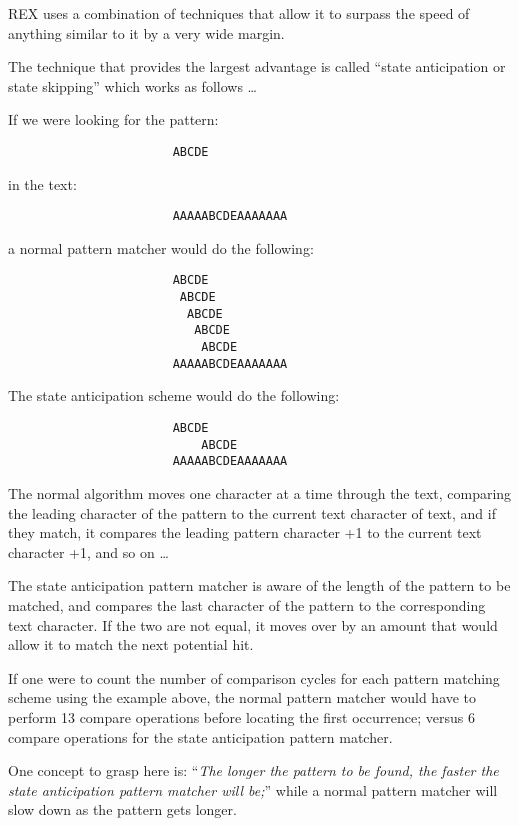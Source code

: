 REX uses a combination of techniques that allow it to surpass the
speed of anything similar to it by a very wide margin.

The technique that provides the largest advantage is called ``state
anticipation or state skipping'' which works as follows \ldots

If we were looking for the pattern:
\begin{verbatim}
                       ABCDE
\end{verbatim}
in the text:
\begin{verbatim}
                       AAAAABCDEAAAAAAA
\end{verbatim}
a normal pattern matcher would do the following:
\begin{verbatim}
                       ABCDE
                        ABCDE
                         ABCDE
                          ABCDE
                           ABCDE
                       AAAAABCDEAAAAAAA
\end{verbatim}

The state anticipation scheme would do the following:

\begin{verbatim}
                       ABCDE
                           ABCDE
                       AAAAABCDEAAAAAAA
\end{verbatim}

The normal algorithm moves one character at a time through the text,
comparing the leading character of the pattern to the current text
character of text, and if they match, it compares the leading pattern
character +1 to the current text character +1, and so on \ldots

The state anticipation pattern matcher is aware of the length of the
pattern to be matched, and compares the last character of the pattern
to the corresponding text character.  If the two are not equal, it
moves over by an amount that would allow it to match the next
potential hit.

If one were to count the number of comparison cycles for each pattern
matching scheme using the example above, the normal pattern matcher
would have to perform 13 compare operations before locating the first
occurrence; versus 6 compare operations for the state anticipation
pattern matcher.

One concept to grasp here is:  ``{\em The longer the pattern to be
found, the faster the state anticipation pattern matcher will be;}''
while a normal pattern matcher will slow down as the pattern gets
longer.

